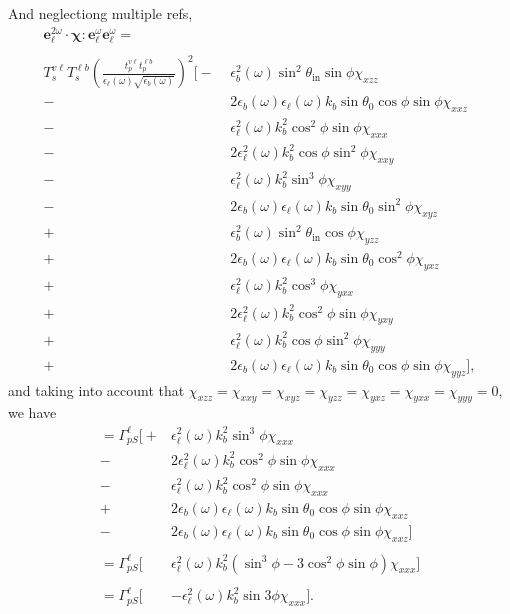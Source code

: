 And neglectiong multiple refs,
\begin{equation*}
\begin{split}
\mathbf{e}^{2\omega}_{\ell}
\cdot\boldsymbol{\chi}:
\mathbf{e}^{\omega}_{\ell}\mathbf{e}^{\omega}_{\ell} =
\qquad\qquad\qquad&\\\\
T^{v\ell}_{s}T^{\ell b}_{s}\left(\frac{t^{v\ell}_{p}t^{\ell b}_{p}}
      {\epsilon_{\ell}(\omega)\sqrt{\epsilon_{b}(\omega)}}\right)^{2}
\big[
- &\epsilon_{b}^{2}(\omega)\sin^{2}\theta_{\mathrm{in}}\sin\phi\chi_{xzz}\\
-&2\epsilon_{b}(\omega)\epsilon_{\ell}(\omega)k_{b}\sin\theta_{0}
   \cos\phi\sin\phi\chi_{xxz}\\
- &\epsilon^{2}_{\ell}(\omega)k^{2}_{b}\cos^{2}\phi\sin\phi\chi_{xxx}\\
-&2\epsilon^{2}_{\ell}(\omega)k^{2}_{b}\cos\phi\sin^{2}\phi\chi_{xxy}\\
- &\epsilon^{2}_{\ell}(\omega)k^{2}_{b}\sin^{3}\phi\chi_{xyy}\\
-&2\epsilon_{b}(\omega)\epsilon_{\ell}(\omega)k_{b}\sin\theta_{0}
   \sin^{2}\phi\chi_{xyz}\\
+ &\epsilon_{b}^{2}(\omega)\sin^{2}\theta_{\mathrm{in}}\cos\phi\chi_{yzz}\\
+&2\epsilon_{b}(\omega)\epsilon_{\ell}(\omega)k_{b}\sin\theta_{0}
   \cos^{2}\phi\chi_{yxz}\\
+ &\epsilon^{2}_{\ell}(\omega)k^{2}_{b}\cos^{3}\phi\chi_{yxx}\\
+&2\epsilon^{2}_{\ell}(\omega)k^{2}_{b}\cos^{2}\phi\sin\phi\chi_{yxy}\\
+ &\epsilon^{2}_{\ell}(\omega)k^{2}_{b}\cos\phi\sin^{2}\phi\chi_{yyy}\\
+&2\epsilon_{b}(\omega)\epsilon_{\ell}(\omega)k_{b}\sin\theta_{0}
   \cos\phi\sin\phi\chi_{yyz}
\big],
\end{split}
\end{equation*}
and taking into account that $\chi_{xzz} = \chi_{xxy} = \chi_{xyz} = \chi_{yzz}
= \chi_{yxz} = \chi_{yxx} = \chi_{yyy} = 0$, we have
\begin{equation*}
\begin{split}
= \Gamma^{\ell}_{pS}
\big[
+ &\epsilon^{2}_{\ell}(\omega)k^{2}_{b}\sin^{3}\phi\chi_{xxx}\\
-&2\epsilon^{2}_{\ell}(\omega)k^{2}_{b}\cos^{2}\phi\sin\phi\chi_{xxx}\\
- &\epsilon^{2}_{\ell}(\omega)k^{2}_{b}\cos^{2}\phi\sin\phi\chi_{xxx}\\
+&2\epsilon_{b}(\omega)\epsilon_{\ell}(\omega)k_{b}\sin\theta_{0}
   \cos\phi\sin\phi\chi_{xxz}\\
-&2\epsilon_{b}(\omega)\epsilon_{\ell}(\omega)k_{b}\sin\theta_{0}
   \cos\phi\sin\phi\chi_{xxz}
\big]\\\\
= \Gamma^{\ell}_{pS}
\big[
&\epsilon^{2}_{\ell}(\omega)k^{2}_{b}
(\sin^{3}\phi - 3\cos^{2}\phi\sin\phi)\chi_{xxx}
\big]\\\\
= \Gamma^{\ell}_{pS}
\big[
&-\epsilon^{2}_{\ell}(\omega)k^{2}_{b}
\sin3\phi\chi_{xxx}
\big].
\end{split}
\end{equation*}
